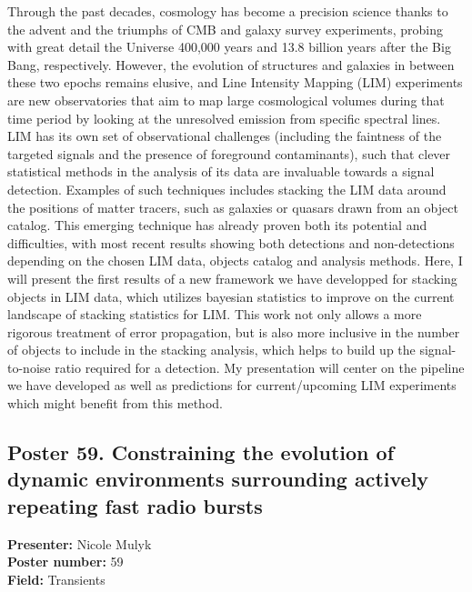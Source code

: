 Through the past decades, cosmology has become a precision science thanks to the advent and the triumphs of CMB and galaxy survey experiments, probing with great detail the Universe 400,000 years and 13.8 billion years after the Big Bang, respectively. However, the evolution of structures and galaxies in between these two epochs remains elusive, and Line Intensity Mapping (LIM) experiments are new observatories that aim to map large cosmological volumes during that time period by looking at the unresolved emission from specific spectral lines. LIM has its own set of observational challenges (including the faintness of the targeted signals and the presence of foreground contaminants), such that clever statistical methods in the analysis of its data are invaluable towards a signal detection. Examples of such techniques includes stacking the LIM data around the positions of matter tracers, such as galaxies or quasars drawn from an object catalog. This emerging technique has already proven both its potential and difficulties, with most recent results showing both detections and non-detections depending on the chosen LIM data, objects catalog and analysis methods. Here, I will present the first results of a new framework we have developped for stacking objects in LIM data, which utilizes bayesian statistics to improve on the current landscape of stacking statistics for LIM. This work not only allows a more rigorous treatment of error propagation, but is also more inclusive in the number of objects to include in the stacking analysis, which helps to build up the signal-to-noise ratio required for a detection. My presentation will center on the pipeline we have developed as well as predictions for current/upcoming LIM experiments which might benefit from this method.

\hypertarget{poster-abstract-talk-201}{}\label{poster-abstract-page-talk-201}
\subsection*{Poster 59. Constraining the evolution of dynamic environments surrounding actively repeating fast radio bursts}
\textbf{Presenter:} Nicole Mulyk\\
\textbf{Poster number:} 59\\
\textbf{Field:} Transients

